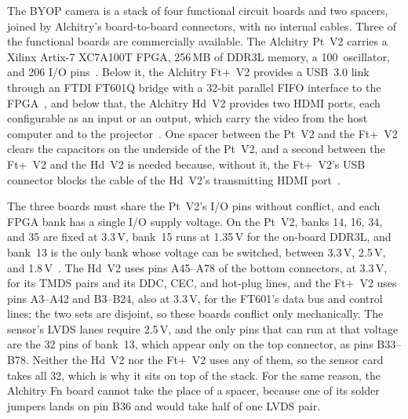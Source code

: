\documentclass[10pt,journal,compsoc]{IEEEtran}
\newcommand{\SI}[2]{#1\,#2}
\begin{document}
The BYOP camera is a stack of four functional circuit boards and two spacers, joined by
Alchitry's board-to-board connectors, with no internal cables. Three of the functional boards are
commercially available. The Alchitry Pt~V2 carries a Xilinx Artix-7 XC7A100T FPGA, \SI{256}{MB}
of DDR3L memory, a \SI{100}{\mega\hertz} oscillator, and 206 I/O pins~\cite{alchitry_pt}. Below it,
the Alchitry Ft+~V2 provides a USB~3.0 link through an FTDI FT601Q bridge with a 32-bit parallel
FIFO interface to the FPGA~\cite{alchitry_ftplus,ftdi_ft601}, and below that, the Alchitry Hd~V2
provides two HDMI ports, each configurable as an input or an output, which carry the video from
the host computer and to the projector~\cite{alchitry_hd}. One spacer between the Pt~V2 and the
Ft+~V2 clears the capacitors on the underside of the Pt~V2, and a second between the Ft+~V2 and
the Hd~V2 is needed because, without it, the Ft+~V2's USB connector blocks the cable of the
Hd~V2's transmitting HDMI port~\cite{alchitry_pt,alchitry_hd}.

The three boards must share the Pt~V2's I/O pins without conflict, and each FPGA bank has a
single I/O supply voltage. On the Pt~V2, banks 14, 16, 34, and 35 are fixed at \SI{3.3}{V},
bank~15 runs at \SI{1.35}{V} for the on-board DDR3L, and bank~13 is the only bank whose voltage
can be switched, between \SI{3.3}{V}, \SI{2.5}{V}, and
\SI{1.8}{V}~\cite{alchitry_pt_sch,alchitry_labs}. The Hd~V2 uses pins A45--A78 of the bottom
connectors, at \SI{3.3}{V}, for its TMDS pairs and its DDC, CEC, and hot-plug lines, and the
Ft+~V2 uses pins A3--A42 and B3--B24, also at \SI{3.3}{V}, for the FT601's data bus and control
lines; the two sets are disjoint, so these boards conflict only mechanically. The sensor's LVDS
lanes require \SI{2.5}{V}, and the only pins that can run at that voltage are the 32 pins of
bank~13, which appear only on the top connector, as pins B33--B78. Neither the Hd~V2 nor the
Ft+~V2 uses any of them, so the sensor card takes all 32, which is why it sits on top of the
stack. For the same reason, the Alchitry Fn board cannot take the place of a spacer, because one
of its solder jumpers lands on pin B36 and would take half of one LVDS pair.
\end{document}
